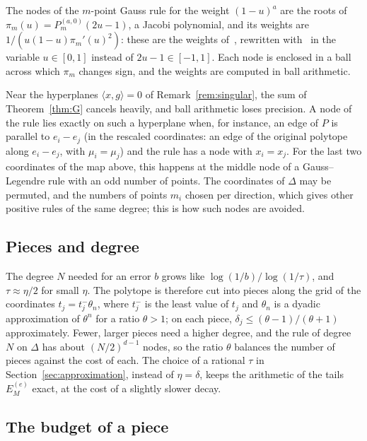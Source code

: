 \documentclass[11pt]{article}
\theoremstyle{remark}
\newcommand{\scal}[2]{\langle #1, #2\rangle}
\begin{document}
The nodes of the $m$-point Gauss rule for the weight $(1 - u)^a$ are the
roots of $\pi_m(u) = P^{(a,0)}_m(2u - 1)$, a Jacobi polynomial, and its
weights are $1/(u (1 - u) \pi_m'(u)^2)$: these are the weights
of~\cite[(2.7.8)]{DavisRabinowitz}, rewritten
with~\cite[(8.961.2--3)]{GradshteynRyzhik} in the variable $u \in [0, 1]$
instead of $2u - 1 \in [-1, 1]$. Each node is enclosed in a ball across
which $\pi_m$ changes sign, and the weights are computed in ball arithmetic.

Near the hyperplanes $\scal{x}{g} = 0$ of Remark~\ref{rem:singular}, the
sum of Theorem~\ref{thm:G} cancels heavily, and ball arithmetic loses
precision. A node of the rule lies exactly on such a hyperplane when, for
instance, an edge of $P$ is parallel to $e_i - e_j$ (in the rescaled
coordinates: an edge of the original polytope along $e_i - e_j$, with $\mu_i
= \mu_j$) and the rule has a node with $x_i = x_j$. For the last two
coordinates of the map above, this happens at the middle node of a
Gauss--Legendre rule with an odd number of points. The coordinates of
$\Delta$ may be permuted, and the numbers of points $m_i$ chosen per
direction, which gives other positive rules of the same degree; this is how
such nodes are avoided.

\subsection{Pieces and degree}
\label{sec:pieces}

The degree $N$ needed for an error $b$ grows like $\log(1/b) /
\log(1/\tau)$, and $\tau \approx \eta/2$ for small $\eta$. The polytope is
therefore cut into pieces along the grid of the coordinates $t_j = t_j^{-}
\theta_n$, where $t_j^{-}$ is the least value of $t_j$ and $\theta_n$ is a
dyadic approximation of $\theta^n$ for a ratio $\theta > 1$; on each piece,
$\delta_j \leq (\theta - 1)/(\theta + 1)$ approximately. Fewer, larger
pieces need a higher degree, and the rule of degree $N$ on $\Delta$ has
about $(N/2)^{d-1}$ nodes, so the ratio $\theta$ balances the number of
pieces against the cost of each. The choice of a rational $\tau$ in
Section~\ref{sec:approximation}, instead of $\eta = \delta$, keeps the
arithmetic of the tails $E^{(e)}_M$ exact, at the cost of a slightly slower
decay.

\subsection{The budget of a piece}
\label{sec:budget}
\end{document}
